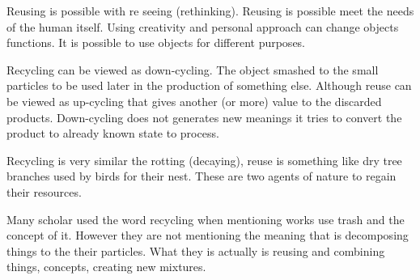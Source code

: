 Reusing is possible with re seeing (rethinking). Reusing is possible meet the needs of the human itself. Using creativity and personal approach can change objects functions. It is possible to use objects for different purposes. 

Recycling can be viewed as down-cycling. The object smashed to the small particles to be used later in the production of something else. Although reuse can be viewed as up-cycling that gives another (or more) value to the discarded products. Down-cycling does not generates new meanings it tries to convert the product to already known state to process. 

Recycling is very similar the rotting (decaying), reuse is something like dry tree branches used by birds for their nest. These are two agents of nature to regain their resources.

Many scholar used the word recycling when mentioning works use trash and the concept of it. However they are not mentioning the meaning that is decomposing things to the their particles. What they is actually is reusing and combining things, concepts, creating new mixtures.




